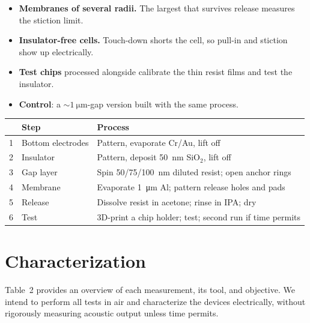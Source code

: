\documentclass[11pt]{article}
\begin{document}
\begin{itemize}
  \item \textbf{Membranes of several radii.} The largest that survives release measures the stiction limit.
  \item \textbf{Insulator-free cells.} Touch-down shorts the cell, so pull-in and stiction show up electrically.
  \item \textbf{Test chips} processed alongside calibrate the thin resist films and test the insulator.
  \item \textbf{Control}: a ${\sim}\SI{1}{\micro\meter}$-gap version built with the same process.
\end{itemize}

\begin{center}
  \vspace{-2pt}
  \small\setlength{\tabcolsep}{8pt}
  \begin{tabularx}{\textwidth}{@{}r P{3.4cm} L@{}}
    \toprule
    & \textbf{Step} & \textbf{Process} \\
     & Bottom electrodes & Pattern, evaporate Cr/Au, lift off \\
    2 & Insulator         & Pattern, deposit \SI{50}{nm} SiO$_2$, lift off \\
    3 & Gap layer         & Spin 50/75/\SI{100}{nm} diluted resist; open anchor rings \\
    4 & Membrane          & Evaporate \SI{1}{\micro\meter} Al; pattern release holes and pads \\
    5 & Release           & Dissolve resist in acetone; rinse in IPA; dry \\
    6 & Test              & 3D-print a chip holder; test; second run if time permits \\
    \bottomrule
  \end{tabularx}
  \vspace{-8pt}
\end{center}

\section{Characterization}

Table~2 provides an overview of each measurement, its tool, and objective. We intend to perform all tests in air and characterize the devices electrically, without rigorously measuring acoustic output unless time permits.
\end{document}
